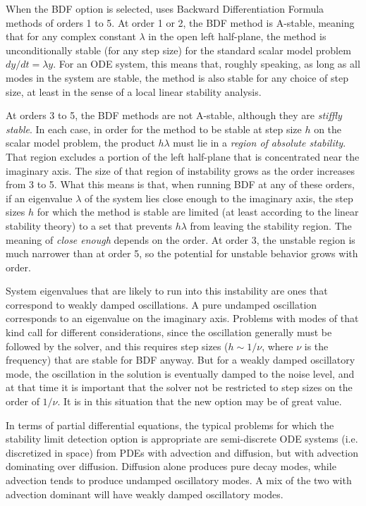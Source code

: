 When the BDF option is selected, {\cvodes} uses Backward Differentiation 
Formula methods of orders 1 to 5.  At order 1 or 2, the BDF
method is A-stable, meaning that for any complex constant $\lambda$ in
the open left half-plane, the method is unconditionally stable (for
any step size) for the standard scalar model problem $dy/dt = \lambda y$.
For an ODE system, this means that, roughly speaking, as long as all
modes in the system are stable, the method is also stable for any
choice of step size, at least in the sense of a local linear stability
analysis.

At orders 3 to 5, the BDF methods are not A-stable, although they are
{\em stiffly stable}. In each case, in order for the method to be stable
at step size $h$ on the scalar model problem, the product $h\lambda$ must
lie in a {\em region of absolute stability}. 
That region excludes a portion of the left half-plane that is concentrated 
near the imaginary axis.  The size of that region of instability grows as the order
increases from 3 to 5.  What this means is that, when running BDF at
any of these orders, if an eigenvalue $\lambda$ of the system lies close
enough to the imaginary axis, the step sizes $h$ for which the method is
stable are limited (at least according to the linear stability theory)
to a set that prevents $h\lambda$ from leaving the stability region.
The meaning of {\em close enough} depends on the order.  
At order 3, the unstable region is much narrower than at order 5, 
so the potential for unstable behavior grows with order.

System eigenvalues that are likely to run into this instability are
ones that correspond to weakly damped oscillations.  A pure undamped
oscillation corresponds to an eigenvalue on the imaginary axis.
Problems with modes of that kind call for different considerations,
since the oscillation generally must be followed by the solver, and
this requires step sizes ($h \sim 1/\nu$, where $\nu$ is the frequency) 
that are stable for BDF anyway.  But for a weakly damped oscillatory mode,
the oscillation in the solution is eventually damped to the noise level, 
and at that time it is important that the solver not be restricted to step 
sizes on the order of $1/\nu$.  It is in this situation that the new option may
be of great value.

In terms of partial differential equations, the typical problems for
which the stability limit detection option is appropriate are
semi-discrete ODE systems (i.e. discretized in space) from PDEs with
advection and diffusion, but with advection dominating over diffusion.
Diffusion alone produces pure decay modes, while advection tends to
produce undamped oscillatory modes.  A mix of the two with advection
dominant will have weakly damped oscillatory modes.

